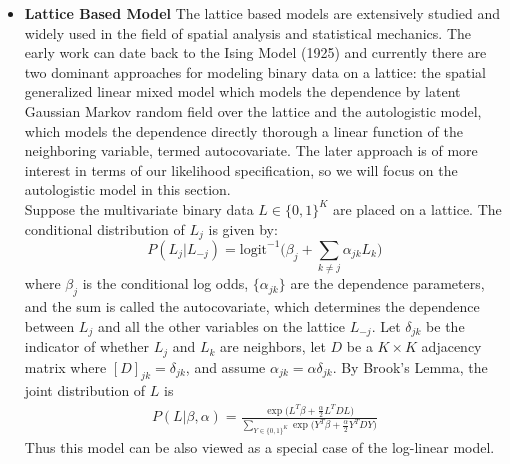 \documentclass[11 pt, a4paper]{article}  %
\begin{document}
\begin{itemize}
\item {\bf Lattice Based Model}
The lattice based models are extensively studied and widely used in the field of spatial analysis and statistical mechanics. The early work can date back to the Ising Model (1925) \cite{ising1925beitrag} and currently there are two dominant approaches for modeling binary data on a lattice: the spatial generalized linear mixed model which models the dependence by latent Gaussian Markov random field over the lattice \cite{banerjee2014hierarchical} and the autologistic model, which models the dependence directly \cite{besag1974spatial} thorough a linear function of the neighboring variable, termed autocovariate. The later approach is of more interest in terms of our likelihood specification, so we will focus on the autologistic model in this section.\\

Suppose the multivariate binary data $L\in \{0,1\}^K$ are placed on a lattice. The conditional distribution of $L_j$ is given by:
\[
P(L_j|L_{-j}) = \text{logit}^{-1} \Big ( \beta_j + \sum_{k\neq j} \alpha_{jk}L_k \Big )
\]
where $\beta_j$ is the conditional log odds, $\{\alpha_{jk}\}$ are the dependence parameters, and the sum is called the autocovariate, which determines the dependence between $L_j$ and all the other variables on the lattice $L_{-j}$. Let $\delta_{jk}$ be the indicator of whether $L_j$ and $L_k$ are neighbors, let $D$ be a $K\times K$ adjacency matrix where $[D]_{jk}=\delta_{jk}$, and assume $\alpha_{jk}=\alpha \delta_{jk}$. By Brook's Lemma, the joint distribution of $L$ is
\begin{align*}
P(L|\beta,\alpha) = \frac{\exp \big ( L^T\beta + \frac{\alpha}{2} L^T D L \big )}
{\sum_{Y\in \{0,1\}^K } \exp \big ( Y^T\beta + \frac{\alpha}{2} Y^T D Y \big )}
\end{align*} 
Thus this model can be also viewed as a special case of the log-linear model.
\end{itemize}



\newpage
\end{document}
